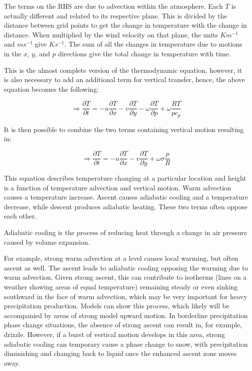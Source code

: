 The terms on the RHS are due to advection within the atmosphere. Each $T$ is actually different and related to its respective plane. This is divided by the distance between grid points to get the change in temperature with the change in distance. When multiplied by the wind velocity on that plane, the units $K m^{-1}$ and $m s^{-1}$ give $K s^{-1}$. The sum of all the changes in temperature due to motions in the $x$, $y$, and $p$ directions give the total change in temperature with time\cite{primitive_equations}.

This is the almost complete version of the thermodynamic equation, however, it is also necessary to add an additional term for vertical transfer, hence, the above equation becomes the following:

\begin{equation}
    \Rightarrow \frac{\partial T}{\partial t} = -u \frac{\partial T}{\partial x} - v \frac{\partial T}{\partial y} - \omega \frac{\partial T}{\partial p} + \omega \frac{R T}{p c_p}
\end{equation}

It is then possible to combine the two terms containing vertical motion resulting in:

\begin{equation}
    \Rightarrow \frac{\partial T}{\partial t} = -u \frac{\partial T}{\partial x} - v \frac{\partial T}{\partial y} + \omega \sigma \frac{p}{R}
    \label{analytic_temp_final}
\end{equation}

This equation describes temperature changing at a particular location and height is a function of temperature advection and vertical motion. Warm advection causes a temperature increase. Ascent causes adiabatic cooling and a temperature decrease, while descent produces adiabatic heating. These two terms often oppose each other. 

\begin{definition}
Adiabatic cooling is the process of reducing heat through a change in air pressure caused by volume expansion.
\end{definition}

For example, strong warm advection at a level causes local warming, but often ascent as well. The ascent leads to adiabatic cooling opposing the warming due to warm advection. Given strong ascent, this can contribute to isotherms (lines on a weather showing areas of equal temperature) remaining steady or even sinking southward in the face of warm advection, which may be very important for heavy precipitation production. Models can show this process, which likely will be accompanied by areas of strong model upward motion. In borderline precipitation phase change situations, the absence of strong ascent can result in, for example, drizzle. However, if a burst of vertical motion develops in this area, strong adiabatic cooling can temporary cause a phase change to snow, with precipitation diminishing and changing back to liquid once the enhanced ascent zone moves away\cite{describe_quasi}.

